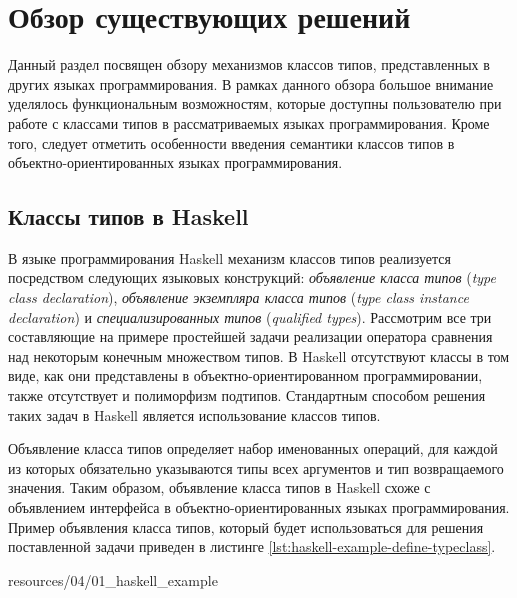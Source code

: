 \chapter{Обзор существующих решений}

Данный раздел посвящен обзору механизмов классов типов, представленных в других языках программирования. В рамках данного обзора большое внимание уделялось функциональным возможностям, которые доступны пользователю при работе с классами типов в рассматриваемых языках программирования. Кроме того, следует отметить особенности введения семантики классов типов в объектно-ориентированных языках программирования. 

\section{Классы типов в Haskell \label{sct:overview-haskell}}

В языке программирования Haskell механизм классов типов реализуется посредством следующих языковых конструкций: \emph{объявление класса типов} (\emph{type class declaration}), \emph{объявление экземпляра класса типов} (\emph{type class instance declaration}) и \emph{специализированных типов} (\emph{qualified types}). Рассмотрим все три составляющие на примере простейшей задачи реализации оператора сравнения над некоторым конечным множеством типов. В Haskell отсутствуют классы в том виде, как они представлены в объектно-ориентированном программировании, также отсутствует и полиморфизм подтипов. Стандартным способом решения таких задач в Haskell является использование классов типов.

Объявление класса типов определяет набор именованных операций, для каждой из которых обязательно указываются типы всех аргументов и тип возвращаемого значения. Таким образом, объявление класса типов в Haskell схоже с объявлением интерфейса в объектно-ориентированных языках программирования. Пример объявления класса типов, который будет использоваться для решения поставленной задачи приведен в листинге \ref{lst:haskell-example-define-typeclass}.    


{resources/04/01_haskell_example}

